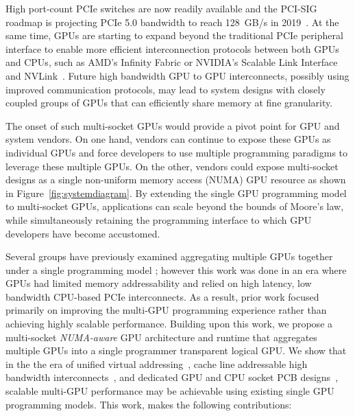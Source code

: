 High port-count PCIe switches are now readily available
and the PCI-SIG roadmap is projecting PCIe 5.0 bandwidth 
to reach \SI{128}{GB/s} in 2019~\cite{PCIeSwitches}. At the same time, GPUs are starting to expand 
beyond the traditional PCIe peripheral interface to enable more efficient interconnection
protocols between both GPUs and CPUs, such as AMD's Infinity Fabric or NVIDIA's Scalable Link Interface
and NVLink~\cite{dgx,SierraHPC,AMDINFINITYFABRIC,NVLINK,NVIDIASLI}.
Future high bandwidth GPU to GPU interconnects, possibly using
improved communication protocols, may lead to system designs with closely coupled
groups of GPUs that can efficiently share memory at fine granularity.

The onset of such multi-socket GPUs would provide a pivot point for GPU and system 
vendors. On one hand, vendors can continue to expose these GPUs as 
individual GPUs and force developers to use multiple
programming paradigms to 
leverage these multiple GPUs. On the other, vendors could expose multi-socket 
designs as a single non-uniform memory access (NUMA) GPU resource as shown in Figure~\ref{fig:systemdiagram}.  
By extending the single GPU programming model to multi-socket GPUs,  applications 
can scale beyond the bounds of Moore's law, while simultaneously retaining the 
programming interface to which GPU developers have become accustomed.

Several groups have previously examined aggregating multiple GPUs together under 
a single programming model \cite{lee2013transparent,Cabezas2015}; however this 
work was done in an era where GPUs had limited memory addressability and relied 
on high latency, low bandwidth CPU-based PCIe interconnects. As a result, prior work 
focused primarily on improving the multi-GPU programming experience rather than 
achieving highly scalable performance. Building upon this work, we propose a 
multi-socket \textit{NUMA-aware} GPU architecture and runtime that aggregates 
multiple GPUs into a single programmer transparent logical GPU. We show that in 
the the era of unified virtual addressing~\cite{UVM}, cache line addressable 
high bandwidth interconnects~\cite{NVLINK}, and dedicated GPU and CPU socket PCB 
designs~\cite{SierraHPC}, scalable multi-GPU performance may be achievable using 
existing single GPU programming models. This work, makes the following 
contributions:

